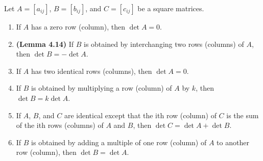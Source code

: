 \begin{theorem}
	Let $ A=\left[a_{ij}\right] $, $B = [b_{ij}]$, and $C = [c_{ij}]$ be a square matrices.
	\begin{enumerate}
		\item If $ A $ has a zero row (column), then $ \det A = 0 $.
		\item \textbf{(Lemma 4.14)} If $ B $ is obtained by interchanging two rows (columns) of $ A $, then $ \det B = -\det A $.
		\item If $ A $ has two identical rows (columns), then $ \det A = 0 $.
		\item If $ B $ is obtained by multiplying a row (column) of $ A $ by $ k $, then $ \det B = k\det A $.
		\item If $ A $, $ B $, and $ C $ are identical except that the ith row (column) of $ C $ is the sum of the ith rows (columns) of $ A $ and $ B $, then $ \det C = \det A + \det B $.
		\item If $ B $ is obtained by adding a multiple of one row (column) of $ A $ to another row (column), then $ \det B = \det A $.
	\end{enumerate}
\end{theorem}
